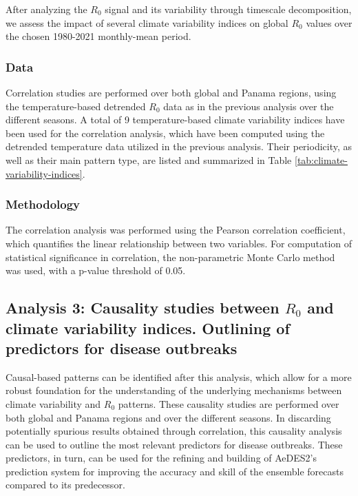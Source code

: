 \documentclass[article,10pt,twocolumn]{wlscirep}
\begin{document}
After analyzing the $R_0$ signal and its variability through timescale decomposition, we assess the impact of several climate variability indices on global $R_0$ values over the chosen 1980-2021 monthly-mean period.

\subsubsection{Data} \label{sec-methods-2-data}

Correlation studies are performed over both global and Panama regions, using the temperature-based detrended $R_0$ data as in the previous analysis over the different seasons. A total of 9 temperature-based climate variability indices have been used for the correlation analysis, which have been computed using the detrended temperature data utilized in the previous analysis. Their periodicity, as well as their main pattern type, are listed and summarized in Table \ref{tab:climate-variability-indices}.


\subsubsection{Methodology} \label{sec-methods-2-methodology}

The correlation analysis was performed using the Pearson correlation coefficient, which quantifies the linear relationship between two variables. For computation of statistical significance in correlation, the non-parametric Monte Carlo method was used, with a p-value threshold of 0.05.

\subsection{Analysis 3: Causality studies between $R_0$ and climate variability indices. Outlining of predictors for disease outbreaks} \label{sec-methods-3}

Causal-based patterns can be identified after this analysis, which allow for a more robust foundation for the understanding of the underlying mechanisms between climate variability and $R_0$ patterns. These causality studies are performed over both global and Panama regions and over the different seasons. In discarding potentially spurious results obtained through correlation, this causality analysis can be used to outline the most relevant predictors for disease outbreaks. These predictors, in turn, can be used for the refining and building of AeDES2's prediction system for improving the accuracy and skill of the ensemble forecasts compared to its predecessor.
\end{document}
